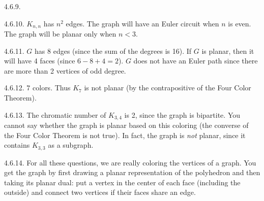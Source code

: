 \begin {itemize}
\begin{ans}{4.6.9.}
\end{ans}
\begin{ans}{4.6.10.}
  $K_{n,n}$ has $n^2$ edges.  The graph will have an Euler circuit when $n$ is even.  The graph will be planar only when $n < 3$.
  
\end{ans}
\begin{ans}{4.6.11.}
  $G$ has 8 edges (since the sum of the degrees is 16).  If $G$ is planar, then it will have 4 faces (since $6 - 8 + 4 = 2$).  $G$ does not have an Euler path since there are more than 2 vertices of odd degree.
  
\end{ans}
\begin{ans}{4.6.12.}
  $7$ colors.  Thus $K_7$ is not planar (by the contrapositive of the Four Color Theorem).
  
\end{ans}
\begin{ans}{4.6.13.}
  The chromatic number of $K_{3,4}$ is 2, since the graph is bipartite.  You cannot say whether the graph is planar based on this coloring (the converse of the Four Color Theorem is not true).  In fact, the graph is {\em not} planar, since it contains $K_{3,3}$ as a subgraph.
  
\end{ans}
\begin{ans}{4.6.14.}
		For all these questions, we are really coloring the vertices of a graph.  You get the graph by first drawing a planar representation of the polyhedron and then taking its planar dual: put a vertex in the center of each face (including the outside) and connect two vertices if their faces share an edge.
\end{ans}
\end{itemize}
